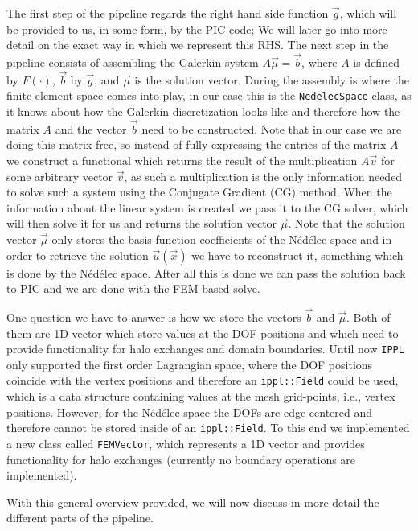 The first step of the pipeline regards the right hand side function $\vec{g}$, which will be provided to us, in some form, by the PIC code; We will later go into more detail on the exact way in which we represent this RHS. The next step in the pipeline consists of assembling the Galerkin system $A\vec{\mu} = \vec{b}$, where $A$ is defined by $F(\cdot)$, $\vec{b}$ by \(\vec g\), and \(\vec\mu\) is the solution vector. During the assembly is where the finite element space comes into play, in our case this is the \texttt{NedelecSpace} class, as it knows about how the Galerkin discretization looks like and therefore how the matrix \(A\) and the vector \(\vec b\) need to be constructed. Note that in our case we are doing this matrix-free, so instead of fully expressing the entries of the matrix $A$ we construct a functional which returns the result of the multiplication $A\vec{v}$ for some arbitrary vector $\vec{v}$, as such a multiplication is the only information needed to solve such a system using the Conjugate Gradient (CG) method. When the information about the linear system is created we pass it to the CG solver, which will then solve it for us and returns the solution vector $\vec{\mu}$. Note that the solution vector $\vec{\mu}$ only stores the basis function coefficients of the Nédélec space and in order to retrieve the solution $\vec{u}(\vec{x})$ we have to reconstruct it, something which is done by the Nédélec space. After all this is done we can pass the solution back to PIC and we are done with the FEM-based solve.\medskip

One question we have to answer is how we store the vectors $\vec{b}$ and $\vec{\mu}$. Both of them are 1D vector which store values at the DOF positions and which need to provide functionality for halo exchanges and domain boundaries. Until now \texttt{IPPL} only supported the first order Lagrangian space, where the DOF positions coincide with the vertex positions and therefore an \texttt{ippl::Field} could be used, which is a data structure containing values at the mesh grid-points, i.e., vertex positions. However, for the Nédélec space the DOFs are edge centered and therefore cannot be stored inside of an \texttt{ippl::Field}. To this end we implemented a new class called \texttt{FEMVector}, which represents a 1D vector and provides functionality for halo exchanges (currently no boundary operations are implemented).\medskip

With this general overview provided, we will now discuss in more detail the different parts of the pipeline.

